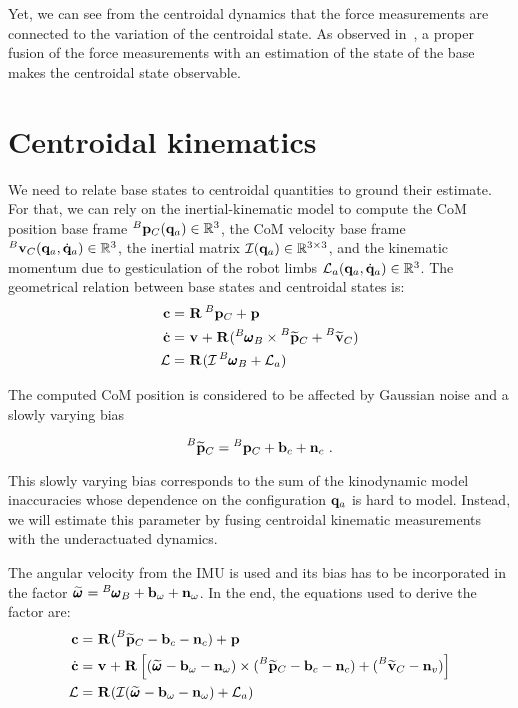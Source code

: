 Yet, we can see from the centroidal dynamics that the force measurements are connected to the variation of the centroidal state.
As observed in~\cite{carpentier2016center}, a proper fusion of the force measurements with an estimation of the state of the base makes the centroidal state observable.



\section{Centroidal kinematics}
\label{sec:centroidal_kinematics}
%
We need to relate base states to centroidal quantities to ground their estimate. 
For that, we can rely on the inertial-kinematic model to compute the CoM position \wrt base frame $\prescript{B}{}{{\bf p}}_{C}({\bf q}_a) \in \mathbb{R}^3$, the CoM velocity \wrt 
base frame $\prescript{B}{}{{\bf v}}_{C}({\bf q}_a, \dot{{\bf q}}_a) \in \mathbb{R}^3$, the inertial matrix $\mathcal{I}({\bf q}_a) \in \mathbb{R}^{3\times 3}$, and the kinematic momentum due to gesticulation 
of the robot limbs $\mathcal{L}_a({\bf q}_a, \dot{{\bf q}}_a) \in \mathbb{R}^{3}$. The geometrical relation between base states and centroidal states is:
%
\begin{equation}
    \begin{split}
    {\bf c} &= \prescript{}{}{{\bf R}}_{} \prescript{B}{}{{\bf p}}_{C} + \prescript{}{}{{\bf p}}_{}
    \\
    \dot{{\bf c}} &= 
    \prescript{}{}{{\bf v}}_{} + \prescript{}{}{{\bf R}}_{}(\prescript{B}{}{\pmb{\omega}}_{B} \times \prescript{B}{}{\widetilde{{\bf p}}}_{C} + \prescript{B}{}{\widetilde{{\bf v}}}_{C})
    \\
    \mathcal{L} &= \prescript{}{}{{\bf R}}_{}(\mathcal{I} \prescript{B}{}{\pmb{\omega}}_{B}+ \mathcal{L}_a)
    \end{split}
\end{equation}


The computed CoM position is considered to be affected by Gaussian noise and a slowly varying bias 

\begin{equation}
    \prescript{B}{}{\widetilde{{\bf p}}}_{C} = \prescript{B}{}{{\bf p}}_{C} + {\bf b}_{c} + {\bf n}_c~.
    \label{eq:com_kine_meas}
\end{equation}

This slowly varying bias corresponds to the sum of the kinodynamic model inaccuracies whose dependence on the configuration ${\bf q}_a$ is hard to model. Instead,
we will estimate this parameter by fusing centroidal kinematic measurements with the underactuated dynamics.

The angular velocity from the IMU is used and its bias has to be incorporated in the factor $\prescript{}{}{\widetilde{\pmb{\omega}}}_{} = \prescript{B}{}{\pmb{\omega}}_{B} + {\bf b}_{\omega} + {\bf n}_{\omega}$.  
In the end, the equations used to derive the factor are:
%
\begin{equation}
    \begin{split}
    {\bf c} &= \prescript{}{}{{\bf R}}_{} (\prescript{B}{}{\widetilde{{\bf p}}}_{C} -  {\bf b}_{c} - {\bf n}_{c}) + \prescript{}{}{{\bf p}}_{}
    \\
    \dot{{\bf c}} &= 
    \prescript{}{}{{\bf v}}_{} + \prescript{}{}{{\bf R}}_{} \left[ (\prescript{}{}{\widetilde{\pmb{\omega}}}_{} - {\bf b}_{\omega} - {\bf n}_{\omega}) \times (\prescript{B}{}{\widetilde{{\bf p}}}_{C} -  {\bf b}_c - {\bf n}_c) + (\prescript{B}{}{\widetilde{{\bf v}}}_{C} - {\bf n}_{v}) \right]
    \\
    \mathcal{L} &= \prescript{}{}{{\bf R}}_{}(\mathcal{I} (\prescript{}{}{\widetilde{\pmb{\omega}}}_{} - {\bf b}_{\omega} - {\bf n}_{\omega}) + \mathcal{L}_a)
    \end{split}
\end{equation}


